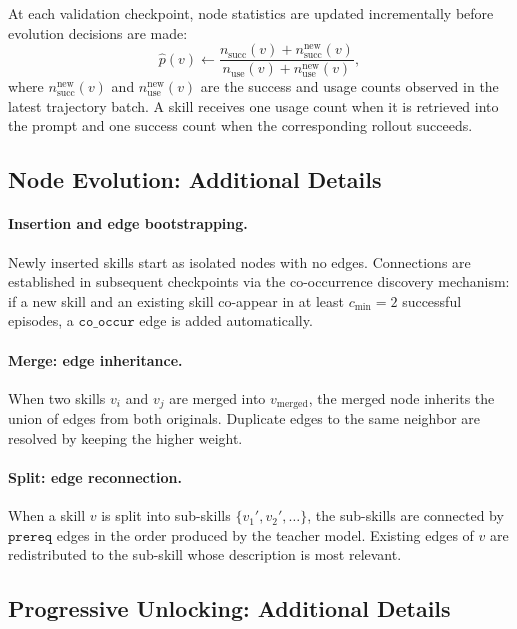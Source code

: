 At each validation checkpoint, node statistics are updated incrementally before evolution decisions are made:
\begin{equation}
    \hat{p}(v) \leftarrow \frac{n_{\text{succ}}(v) + n_{\text{succ}}^{\text{new}}(v)}{n_{\text{use}}(v) + n_{\text{use}}^{\text{new}}(v)},
    \label{eq:stats_update}
\end{equation}
where $n_{\text{succ}}^{\text{new}}(v)$ and $n_{\text{use}}^{\text{new}}(v)$ are the success and usage counts observed in the latest trajectory batch. A skill receives one usage count when it is retrieved into the prompt and one success count when the corresponding rollout succeeds.

\subsection{Node Evolution: Additional Details}
\label{app:node_evolution}

\paragraph{Insertion and edge bootstrapping.} Newly inserted skills start as isolated nodes with no edges. Connections are established in subsequent checkpoints via the co-occurrence discovery mechanism: if a new skill and an existing skill co-appear in at least $c_{\min}=2$ successful episodes, a $\texttt{co\_occur}$ edge is added automatically.

\paragraph{Merge: edge inheritance.} When two skills $v_i$ and $v_j$ are merged into $v_{\text{merged}}$, the merged node inherits the union of edges from both originals. Duplicate edges to the same neighbor are resolved by keeping the higher weight.

\paragraph{Split: edge reconnection.} When a skill $v$ is split into sub-skills $\{v_1', v_2', \ldots\}$, the sub-skills are connected by $\texttt{prereq}$ edges in the order produced by the teacher model. Existing edges of $v$ are redistributed to the sub-skill whose description is most relevant.

\subsection{Progressive Unlocking: Additional Details}
\label{app:unlocking_details}

